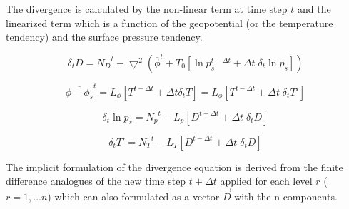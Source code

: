 The divergence is calculated by the 
non-linear term at time step $t$ and the 
linearized term which is a function of the geopotential
(or the temperature tendency) and  
the surface pressure tendency.

\begin{equation}
\delta_t { D} = { N_D}^t - \bigtriangledown^2 (\overline{\phi}^t + T_0 [\ln
p_s^{t - \Delta t} + \Delta t \; \delta_t \ln p_s])
\end{equation}

\begin{equation}
\overline{\phi-\phi_s}^t = L_{\phi} [T^{t - \Delta t} + \Delta t \delta_t T]
= L_{\phi} [T^{t - \Delta t} + \Delta t \; \delta_t T']
\end{equation}

\begin{equation}
\delta_t \ln p_s = {N_p}^t - L_p [D^{t - \Delta t} + \Delta t \; \delta_t D]
\end{equation}

\begin{equation}
\delta_t  T' =  {N_T}^t - L_T [D^{t - \Delta t} + \Delta t \; \delta_t D]
\end{equation}


The implicit formulation of the divergence equation is derived from the
finite difference analogues of the new time step 
$t+\Delta t$ applied for each level $ r$ ($r=1,...n$) which can also
formulated as a vector $\vec{D}$ with the n components.\\


